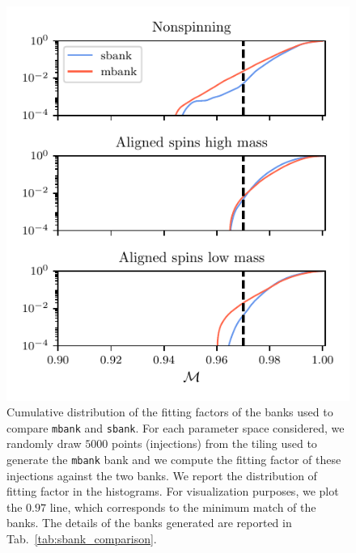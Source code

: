 \documentclass[twocolumn,showpacs,preprintnumbers,nofootinbib,prd,
superscriptaddress,10pt]{revtex4-2}
\begin{document}


\begin{figure}[t!]
	\includegraphics{sbank_comparison}
	\caption{
	Cumulative distribution of the fitting factors of the banks used to compare \texttt{mbank} and \texttt{sbank}. For each parameter space considered, we randomly draw $5000$ points (injections) from the tiling used to generate the \texttt{mbank} bank and we compute the fitting factor of these injections against the two banks. We report the distribution of fitting factor in the histograms. For visualization purposes, we plot the $0.97$ line, which corresponds to the minimum match of the banks.
	The details of the banks generated are reported in Tab.~\ref{tab:sbank_comparison}.
	}
	\label{fig:sbank_comparison}
\end{figure}
\end{document}
